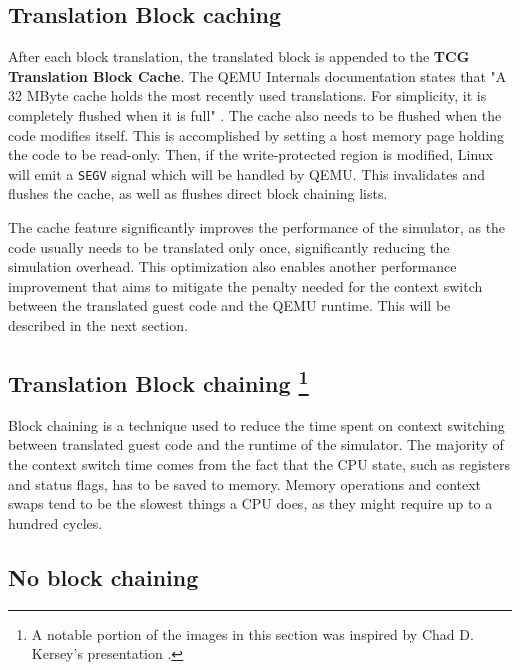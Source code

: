 \subsection{Translation Block caching}

After each block translation, the translated block is appended to the \textbf{TCG Translation Block Cache}.
The QEMU Internals documentation states that "A 32 MByte cache holds the most recently used translations. For simplicity, it is
completely flushed when it is full" \cite{QemuInternalsTech}. The cache also needs to be flushed when the code modifies
itself. This is accomplished by setting a host memory page holding the code to be read-only. Then, if the
write-protected region is modified, Linux will emit a \texttt{SEGV} signal which will be handled by QEMU. This
invalidates and flushes the cache, as well as flushes direct block chaining lists.

The cache feature significantly improves the performance of the simulator, as the code usually needs to be translated only
once, significantly reducing the simulation overhead. This optimization also enables another performance improvement
that aims to mitigate the penalty needed for the context switch between the translated guest code and the
QEMU runtime. This will be described in the next section.

\pagebreak
\subsection[Translation Block chaining]{Translation Block chaining
\footnote{A notable portion of the images in this section was inspired by Chad D. Kersey's presentation
\cite{QemuInternalsPresentation}.}}

Block chaining is a technique used to reduce the time spent on context switching between translated guest code and the
runtime of the simulator. The majority of the context switch time comes from the fact that the CPU state, such as
registers and status flags, has to be saved to memory. Memory operations and context swaps tend to be
the slowest things a CPU does, as they might require up to a hundred cycles.

\subsection*{No block chaining}

